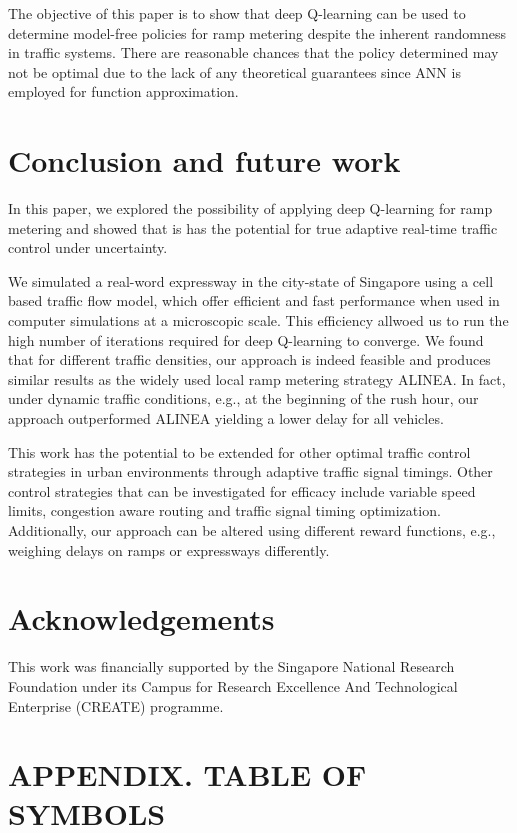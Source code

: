 \documentclass{sig-alternate-05-2015}
\begin{document}
The objective of this paper is to show that deep Q-learning can be used to determine model-free policies for ramp metering despite the inherent randomness in traffic systems. There are reasonable chances that the policy determined may not be optimal due to the lack of any theoretical guarantees since ANN is employed for function approximation. 


 

\section{Conclusion and future work}
\label{sec:conclusion}
In this paper, we explored the possibility of applying deep Q-learning for ramp metering and showed that is has the potential for true adaptive real-time traffic control under uncertainty.

We simulated a real-word expressway in the city-state of Singapore using a cell based traffic flow model, which offer efficient and fast performance when used in computer simulations at a microscopic scale.
This efficiency allwoed us to run the high number of iterations required for deep Q-learning to converge.
We found that for different traffic densities, our approach is indeed feasible and produces similar results as the widely used local ramp metering strategy ALINEA.
In fact, under dynamic traffic conditions, e.g., at the beginning of the rush hour, our approach outperformed ALINEA yielding a lower delay for all vehicles.

This work has the potential to be extended for other optimal traffic control strategies in urban environments through adaptive traffic signal timings.
Other control strategies that can be investigated for efficacy include variable speed limits, congestion aware routing and traffic signal timing optimization.
Additionally, our approach can be altered using different reward functions, e.g., weighing delays on ramps or expressways differently.


\section{Acknowledgements}
This work was financially supported by the Singapore National Research Foundation under its Campus for Research Excellence And Technological Enterprise (CREATE) programme.

\section{APPENDIX. TABLE OF SYMBOLS}
\label{appendix:a}
\end{document}
